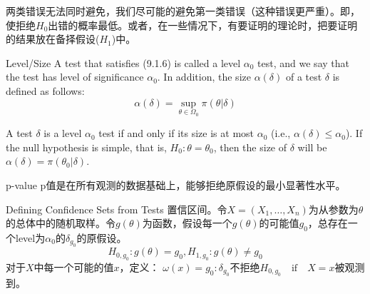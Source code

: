 \documentclass[../main.tex]{subfiles}
\begin{document}
两类错误无法同时避免，我们尽可能的避免第一类错误（这种错误更严重）。即，使拒绝$H_0$出错的概率最低。或者，在一些情况下，有要证明的理论时，把要证明的结果放在备择假设($H_1$)中。


\begin{definition}{Level/Size}{}
A test that satisﬁes (9.1.6) is called a level $\alpha_0$ test, and we say that the test
has level of signiﬁcance $\alpha_0$. In addition, the size $\alpha(\delta)$ of a test $\delta$ is deﬁned as follows:
\begin{equation}\label{}
\alpha(\delta)=\sup\limits_{\theta\in\Omega_0} \pi(\theta|\delta)
\end{equation}
\end{definition}

\begin{corollary}{}{}
A test $\delta$ is a level $\alpha_0$ test if and only if its size is at most $\alpha_0$ (i.e., $\alpha(\delta) \leqslant \alpha_0$). If the null hypothesis is simple, that is, $H_0:\theta = \theta_0$, then the size of $\delta$ will be $\alpha(\delta)=\pi(\theta_0|\delta)$.
\end{corollary}


\begin{definition}{p-value}{}
p值是在所有观测的数据基础上，能够拒绝原假设的最小显著性水平。
\end{definition}

\begin{theorem}{Deﬁning Conﬁdence Sets from Tests}{}
置信区间。令$X=(X_1,\dots,X_n)$为从参数为$\theta$的总体中的随机取样。令$g(\theta)$为函数，假设每一个$g(\theta)$的可能值$g_0$，总存在一个level为$\alpha_0$的$\delta_{g_0}$的原假设。
\begin{equation}\label{}
H_{0, g_0}:g(\theta)=g_0, H_{1, g_0}: g(\theta)\neq g_0
\end{equation}
对于$X$中每一个可能的值$x$，定义：
$\omega(x)={g_0: \delta_{g_0}\text{不拒绝}H_{0, g_0}} \quad\text{if}\quad X=x$被观测到。
\end{theorem}
\end{document}
